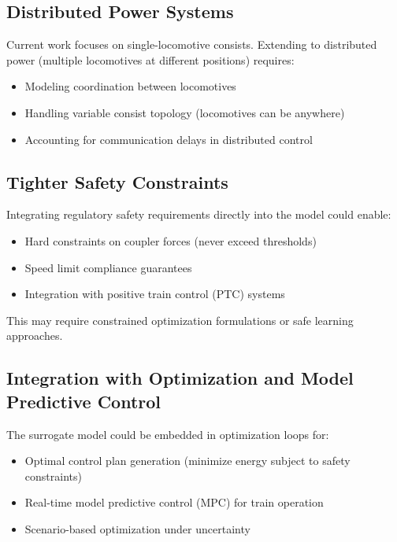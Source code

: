 
\subsection{Distributed Power Systems}

Current work focuses on single-locomotive consists. Extending to distributed power (multiple locomotives at different positions) requires:
\begin{itemize}
    \item Modeling coordination between locomotives
    \item Handling variable consist topology (locomotives can be anywhere)
    \item Accounting for communication delays in distributed control
\end{itemize}


\subsection{Tighter Safety Constraints}

Integrating regulatory safety requirements directly into the model could enable:
\begin{itemize}
    \item Hard constraints on coupler forces (never exceed thresholds)
    \item Speed limit compliance guarantees
    \item Integration with positive train control (PTC) systems
\end{itemize}

This may require constrained optimization formulations or safe learning approaches.


\subsection{Integration with Optimization and Model Predictive Control}

The surrogate model could be embedded in optimization loops for:
\begin{itemize}
    \item Optimal control plan generation (minimize energy subject to safety constraints)
    \item Real-time model predictive control (MPC) for train operation
    \item Scenario-based optimization under uncertainty
\end{itemize}

